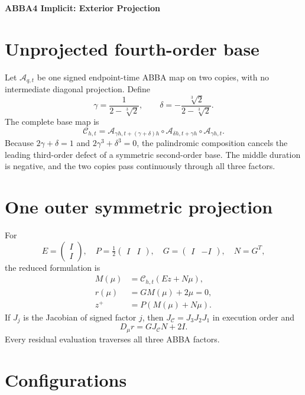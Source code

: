 \documentclass[11pt,a4paper]{article}
\begin{document}
\begin{center}
 {\LARGE\bfseries\color{gcblue}ABBA4 Implicit: Exterior Projection}\par
 \vspace{0.35em}{\large One symmetric projection around an unprojected triple jump}
\end{center}

\section{Unprojected fourth-order base}

Let $\mathcal A_{q,t}$ be one signed endpoint-time ABBA map on two copies,
with no intermediate diagonal projection.  Define
\[
\gamma=\frac{1}{2-\sqrt[3]{2}},\qquad
\delta=-\frac{\sqrt[3]{2}}{2-\sqrt[3]{2}}.
\]
The complete base map is
\[
\mathcal C_{h,t}=
\mathcal A_{\gamma h,t+(\gamma+\delta)h}
\circ\mathcal A_{\delta h,t+\gamma h}
\circ\mathcal A_{\gamma h,t}.
\]
Because $2\gamma+\delta=1$ and $2\gamma^3+\delta^3=0$, the palindromic
composition cancels the leading third-order defect of a symmetric second-order
base.  The middle duration is negative, and the two copies pass continuously
through all three factors.

\section{One outer symmetric projection}

For
\[
E=\begin{pmatrix}I\\I\end{pmatrix},\quad
P=\tfrac12\begin{pmatrix}I&I\end{pmatrix},\quad
G=\begin{pmatrix}I&-I\end{pmatrix},\quad N=G^T,
\]
the reduced formulation is
\begin{align}
M(\mu)&=\mathcal C_{h,t}(Ez+N\mu),\\
r(\mu)&=GM(\mu)+2\mu=0,\\
z^+&=P(M(\mu)+N\mu).
\end{align}
If $J_j$ is the Jacobian of signed factor $j$, then
$J_\mathcal C=J_3J_2J_1$ in execution order and
\[
D_\mu r=GJ_\mathcal C N+2I.
\]
Every residual evaluation traverses all three ABBA factors.

\section{Configurations}
\end{document}
